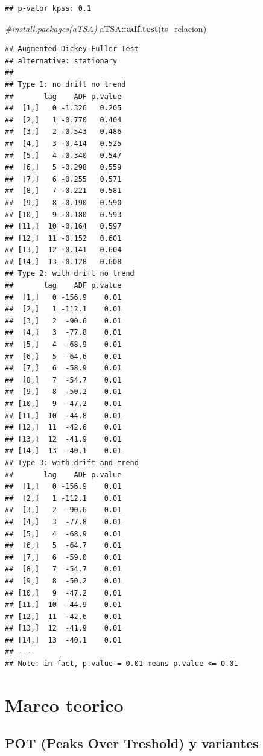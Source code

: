 \documentclass[
  oneside]{article}
\newenvironment{Shaded}{\begin{snugshade}}{\end{snugshade}}
\newcommand{\CommentTok}[1]{\textcolor[rgb]{0.56,0.35,0.01}{\textit{#1}}}
\newcommand{\FunctionTok}[1]{\textcolor[rgb]{0.13,0.29,0.53}{\textbf{#1}}}
\newcommand{\NormalTok}[1]{#1}
\newcommand{\SpecialCharTok}[1]{\textcolor[rgb]{0.81,0.36,0.00}{\textbf{#1}}}
\begin{document}
\begin{verbatim}
## p-valor kpss: 0.1
\end{verbatim}

\begin{Shaded}
\begin{Highlighting}[]
\CommentTok{\#install.packages(\textquotesingle{}aTSA\textquotesingle{})}
\NormalTok{aTSA}\SpecialCharTok{::}\FunctionTok{adf.test}\NormalTok{(ts\_relacion)}
\end{Highlighting}
\end{Shaded}

\begin{verbatim}
## Augmented Dickey-Fuller Test 
## alternative: stationary 
##  
## Type 1: no drift no trend 
##       lag    ADF p.value
##  [1,]   0 -1.326   0.205
##  [2,]   1 -0.770   0.404
##  [3,]   2 -0.543   0.486
##  [4,]   3 -0.414   0.525
##  [5,]   4 -0.340   0.547
##  [6,]   5 -0.298   0.559
##  [7,]   6 -0.255   0.571
##  [8,]   7 -0.221   0.581
##  [9,]   8 -0.190   0.590
## [10,]   9 -0.180   0.593
## [11,]  10 -0.164   0.597
## [12,]  11 -0.152   0.601
## [13,]  12 -0.141   0.604
## [14,]  13 -0.128   0.608
## Type 2: with drift no trend 
##       lag    ADF p.value
##  [1,]   0 -156.9    0.01
##  [2,]   1 -112.1    0.01
##  [3,]   2  -90.6    0.01
##  [4,]   3  -77.8    0.01
##  [5,]   4  -68.9    0.01
##  [6,]   5  -64.6    0.01
##  [7,]   6  -58.9    0.01
##  [8,]   7  -54.7    0.01
##  [9,]   8  -50.2    0.01
## [10,]   9  -47.2    0.01
## [11,]  10  -44.8    0.01
## [12,]  11  -42.6    0.01
## [13,]  12  -41.9    0.01
## [14,]  13  -40.1    0.01
## Type 3: with drift and trend 
##       lag    ADF p.value
##  [1,]   0 -156.9    0.01
##  [2,]   1 -112.1    0.01
##  [3,]   2  -90.6    0.01
##  [4,]   3  -77.8    0.01
##  [5,]   4  -68.9    0.01
##  [6,]   5  -64.7    0.01
##  [7,]   6  -59.0    0.01
##  [8,]   7  -54.7    0.01
##  [9,]   8  -50.2    0.01
## [10,]   9  -47.2    0.01
## [11,]  10  -44.9    0.01
## [12,]  11  -42.6    0.01
## [13,]  12  -41.9    0.01
## [14,]  13  -40.1    0.01
## ---- 
## Note: in fact, p.value = 0.01 means p.value <= 0.01
\end{verbatim}

\newpage

\section{Marco teorico}

\newpage

\subsection{POT (Peaks Over Treshold) y variantes}
\end{document}
